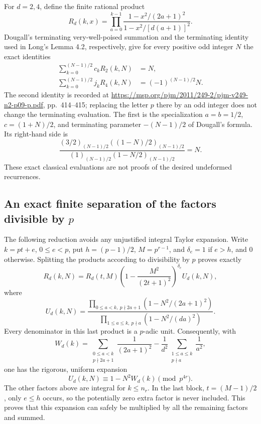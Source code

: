 \documentclass[11pt,letterpaper]{article}
\numberwithin{equation}{section}
\begin{document}
For $d=2,4$, define the finite rational product
\[
 R_d(k,x)=\prod_{a=0}^{k-1}
 \frac{1-x^2/(2a+1)^2}{1-x^2/[d(a+1)]^2}.
\]
Dougall's terminating very-well-poised summation and the terminating
identity used in Long's Lemma 4.2, respectively, give for every positive
odd integer $N$ the exact identities
\begin{align}
 \sum_{k=0}^{(N-1)/2}c_k R_2(k,N)&=N,\\
 \sum_{k=0}^{(N-1)/2}j_k R_4(k,N)&=(-1)^{(N-1)/2}N.
\end{align}
The second identity is recorded at
\url{https://msp.org/pjm/2011/249-2/pjm-v249-n2-p09-p.pdf},
pp.~414--415; replacing the letter $p$ there by an odd integer does not
change the terminating evaluation. The first is the specialization
$a=b=1/2$, $c=(1+N)/2$, and terminating parameter $-(N-1)/2$ of
Dougall's formula. Its right-hand side is
\[
 \frac{(3/2)_{(N-1)/2}((1-N)/2)_{(N-1)/2}}
 {(1)_{(N-1)/2}(1-N/2)_{(N-1)/2}}=N.
\]
These exact classical evaluations are not proofs of the desired
undeformed recurrences.

\subsection{An exact finite separation of the factors divisible by \texorpdfstring{$p$}{p}}
The following reduction avoids any unjustified integral Taylor expansion.
Write $k=pt+e$, $0\le e<p$, put $h=(p-1)/2$, $M=p^{r-1}$,
and $\delta_e=1$ if $e>h$, and $0$ otherwise. Splitting the products
according to divisibility by $p$ proves exactly
\[
 R_d(k,N)=R_d(t,M)
 \left(1-\frac{M^2}{(2t+1)^2}\right)^{\delta_e}U_d(k,N),
\]
where
\[
 U_d(k,N)=
 \frac{\prod_{0\le a<k,\ p\nmid 2a+1}(1-N^2/(2a+1)^2)}
 {\prod_{1\le a\le k,\ p\nmid a}(1-N^2/(da)^2)}.
\]
Every denominator in this last product is a $p$-adic unit. Consequently,
with
\[
 W_d(k)=\sum_{\substack{0\le a<k\\p\nmid 2a+1}}\frac1{(2a+1)^2}
 -\frac1{d^2}\sum_{\substack{1\le a\le k\\p\nmid a}}\frac1{a^2},
\]
one has the rigorous, uniform expansion
\[
 U_d(k,N)\equiv1-N^2W_d(k)\pmod{p^{4r}}.
\]
The other factors above are integral for $k\le n_r$. In the last block,
$t=(M-1)/2$, only $e\le h$ occurs, so the potentially zero extra factor
is never included. This proves that this expansion can safely be
multiplied by all the remaining factors and summed.
\end{document}
